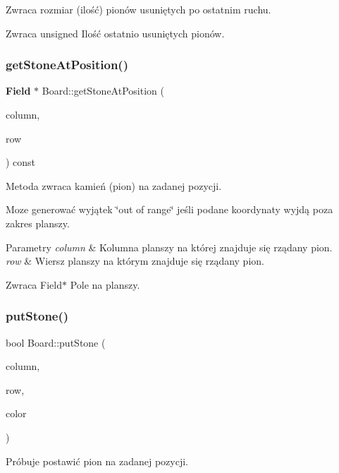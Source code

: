 Zwraca rozmiar (ilość) pionów usuniętych po ostatnim ruchu. 

\begin{DoxyReturn}{Zwraca}
unsigned Ilość ostatnio usuniętych pionów. 
\end{DoxyReturn}
\mbox{\label{class_board_afd16fbc60022ec7c1eac6eabe3b13fd5}} 
\subsubsection{getStoneAtPosition()}
{\footnotesize\ttfamily \textbf{ Field} $\ast$ Board\+::get\+Stone\+At\+Position (\begin{DoxyParamCaption}\item[{unsigned}]{column,  }\item[{unsigned}]{row }\end{DoxyParamCaption}) const}



Metoda zwraca kamień (pion) na zadanej pozycji. 

Moze generować wyjątek \char`\"{}out of range\char`\"{} jeśli podane koordynaty wyjdą poza zakres planszy. 
\begin{DoxyParams}{Parametry}
{\em column} & Kolumna planszy na której znajduje się rządany pion. \\
\hline
{\em row} & Wiersz planszy na którym znajduje się rządany pion. \\
\hline
\end{DoxyParams}
\begin{DoxyReturn}{Zwraca}
Field$\ast$ Pole na planszy. 
\end{DoxyReturn}
\mbox{\label{class_board_a51110be605596241599b70eae3a48b51}} 
\subsubsection{putStone()}
{\footnotesize\ttfamily bool Board\+::put\+Stone (\begin{DoxyParamCaption}\item[{unsigned}]{column,  }\item[{unsigned}]{row,  }\item[{Field\+Color}]{color }\end{DoxyParamCaption})}



Próbuje postawić pion na zadanej pozycji. 

